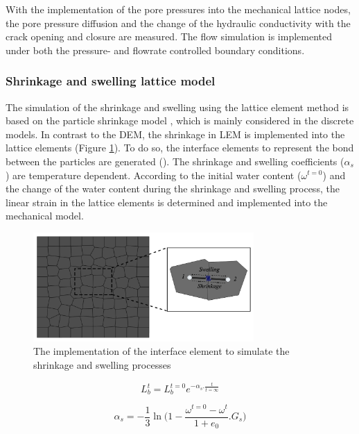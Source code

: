 With the implementation of the pore pressures into the mechanical lattice nodes, the pore pressure diffusion and the change of the hydraulic conductivity with the crack opening and closure are measured. The flow simulation is implemented under both the pressure- and flowrate controlled boundary conditions.


\subsubsection*{Shrinkage and swelling lattice model} 
\label{Section:ShrinkageLattice}

The simulation of the shrinkage and swelling using the lattice element method is based on the particle shrinkage model \cite{Simaetal2013}, which is mainly considered in the discrete models. In contrast to the DEM, the shrinkage in LEM is implemented into the lattice elements (Figure \ref{fig:Amir_LEM_Shrinkage}). To do so, the interface elements to represent the bond between the particles are generated (\cite{Sattarietal2019b}). The shrinkage and swelling coefficients ($\alpha_s$) are temperature dependent. According to the initial water content ($\omega^{t=0}$) and the change of the water content during the shrinkage and swelling process, the linear strain in the lattice elements is determined and implemented into the mechanical model. 

\begin{figure}[!ht]
\centering
\includegraphics[width=0.75\textwidth]{figures/Amir_LEM_Shrinkage.png}
\caption{The implementation of the interface element to simulate the shrinkage and swelling processes}
\label{fig:Amir_LEM_Shrinkage}
\end{figure}

\begin{equation}
\label{eq:LEM_Shrinkage_1}
L_b^t=L_b^{t=0}e^{-\alpha_s.\frac{t}{t=\infty}}
\end{equation}

\begin{equation}
\label{eq:LEM_Shrinkage_2}
\alpha_s=-\frac{1}{3}\ln{(1-\frac{\omega^{t=0}-\omega^{t}}{1+e_0}}.G_s)
\end{equation}


